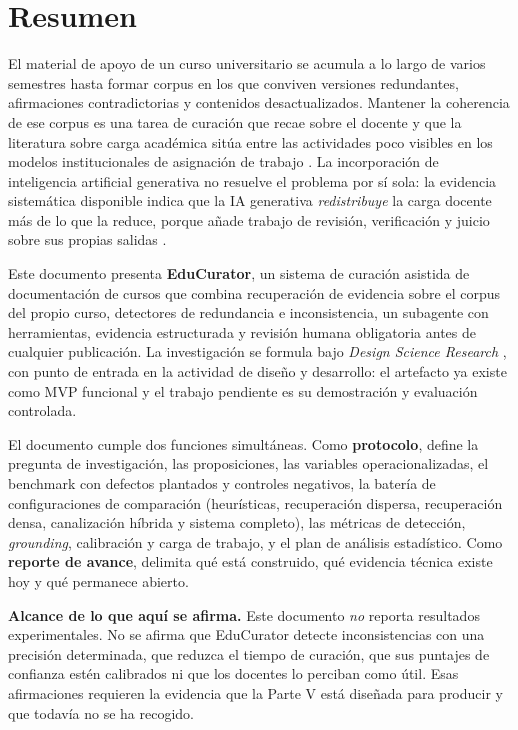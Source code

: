 \section*{Resumen}

El material de apoyo de un curso universitario se acumula a lo largo de varios
semestres hasta formar corpus en los que conviven versiones redundantes,
afirmaciones contradictorias y contenidos desactualizados. Mantener la coherencia
de ese corpus es una tarea de curación que recae sobre el docente y que la
literatura sobre carga académica sitúa entre las actividades poco visibles en los
modelos institucionales de asignación de trabajo \parencite{kenny2023life}. La
incorporación de inteligencia artificial generativa no resuelve el problema por sí
sola: la evidencia sistemática disponible indica que la IA generativa
\emph{redistribuye} la carga docente más de lo que la reduce, porque añade trabajo
de revisión, verificación y juicio sobre sus propias salidas
\parencite{su2026efficiency}.

Este documento presenta \textbf{EduCurator}, un sistema de curación asistida de
documentación de cursos que combina recuperación de evidencia sobre el corpus del
propio curso, detectores de redundancia e inconsistencia, un subagente con
herramientas, evidencia estructurada y revisión humana obligatoria antes de
cualquier publicación. La investigación se formula bajo
\emph{Design Science Research} \parencite{peffers2007design,hevner2004design}, con
punto de entrada en la actividad de diseño y desarrollo: el artefacto ya existe
como MVP funcional y el trabajo pendiente es su demostración y evaluación
controlada.

El documento cumple dos funciones simultáneas. Como \textbf{protocolo}, define la
pregunta de investigación, las proposiciones, las variables operacionalizadas, el
benchmark con defectos plantados y controles negativos, la batería de
configuraciones de comparación (heurísticas, recuperación dispersa, recuperación
densa, canalización híbrida y sistema completo), las métricas de detección,
\emph{grounding}, calibración y carga de trabajo, y el plan de análisis
estadístico. Como \textbf{reporte de avance}, delimita qué está construido, qué
evidencia técnica existe hoy y qué permanece abierto.

\begin{estado}
\small
\textbf{Alcance de lo que aquí se afirma.} Este documento \emph{no} reporta
resultados experimentales. No se afirma que EduCurator detecte inconsistencias con
una precisión determinada, que reduzca el tiempo de curación, que sus puntajes de
confianza estén calibrados ni que los docentes lo perciban como útil. Esas
afirmaciones requieren la evidencia que la Parte V está diseñada para producir y
que todavía no se ha recogido.
\end{estado}

